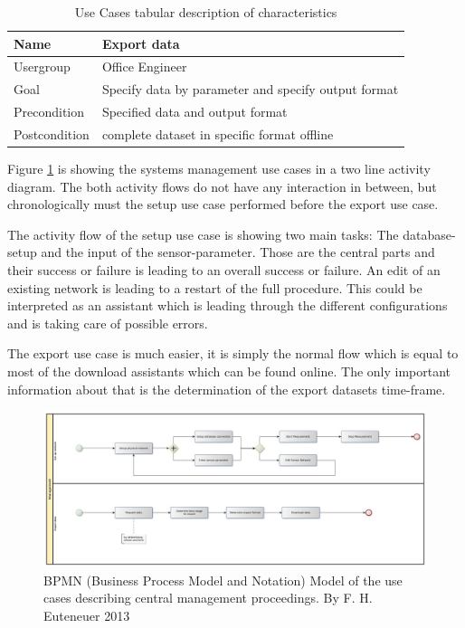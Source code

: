 \begin{table}[H]
\centering
\begin{tabular}{l | p{11cm}}
Name & Export data\\ \hline 
Usergroup & Office Engineer\\ \hline 
Goal & Specify data by parameter and specify output format\\ \hline 
Precondition & Specified data and output format\\ \hline 
Postcondition & complete dataset in specific format offline\\ 
\end{tabular}
\caption{Use Cases tabular description of characteristics} 
\label{table:use case description of "Export data"}
\end{table}

Figure \ref{fig:bpmn_use-case_management} is showing the systems management use cases in a two line activity diagram. The both activity flows do not have any interaction in between, but chronologically must the setup use case performed before the export use case.

The activity flow of the setup use case is showing two main tasks: The database-setup and the input of the sensor-parameter. Those are the central parts and their success or failure is leading to an overall success or failure. An edit of an existing network is leading to a restart of the full procedure. This could be interpreted as an assistant which is leading through the different configurations and is taking care of possible errors.

The export use case is much easier, it is simply the normal flow which is equal to most of the download assistants which can be found online. The only important information about that is the determination of the export datasets time-frame.

\begin{figure}[H]
	\centering
 	 \includegraphics[scale=0.24]{graphics/bpmn_use-cases_management.jpg} 
	\caption{BPMN (Business Process Model and Notation) Model of the use cases describing central management proceedings. By F. H. Euteneuer 2013}
	 \label{fig:bpmn_use-case_management}
\end{figure}


